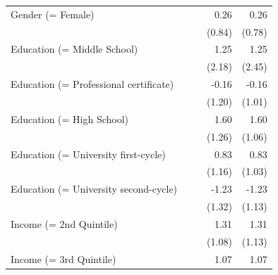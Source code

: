 \begin{table}[h!]
\begin{center}
\begin{footnotesize}
\begin{tabular}{l D{.}{.}{2.3} D{.}{.}{2.7} D{.}{.}{2.3} D{.}{.}{2.3}}
Gender (= Female)                      &                        &                         & 0.26                   & 0.26                    \\
                                       &                        &                         & (0.84)                 & (0.78)                  \\
Education (= Middle School)            &                        &                         & 1.25                   & 1.25                    \\
                                       &                        &                         & (2.18)                 & (2.45)                  \\
Education (= Professional certificate) &                        &                         & -0.16                  & -0.16                   \\
                                       &                        &                         & (1.20)                 & (1.01)                  \\
Education (= High School)              &                        &                         & 1.60                   & 1.60                    \\
                                       &                        &                         & (1.26)                 & (1.06)                  \\
Education (= University first-cycle)   &                        &                         & 0.83                   & 0.83                    \\
                                       &                        &                         & (1.16)                 & (1.03)                  \\
Education (= University second-cycle)  &                        &                         & -1.23                  & -1.23                   \\
                                       &                        &                         & (1.32)                 & (1.13)                  \\
Income (= 2nd Quintile)                &                        &                         & 1.31                   & 1.31                    \\
                                       &                        &                         & (1.08)                 & (1.13)                  \\
Income (= 3rd Quintile)                &                        &                         & 1.07                   & 1.07                    \\

\end{tabular}
\end{footnotesize}
\end{center}
\end{table}
